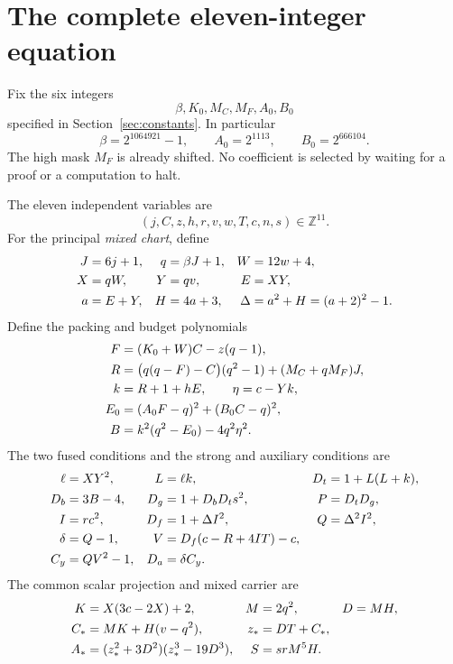 \documentclass[11pt]{article}
\newcommand{\Z}{\mathbb Z}
\theoremstyle{definition}
\theoremstyle{remark}
\begin{document}
\section{The complete eleven-integer equation}
\label{sec:equation}

Fix the six integers
\[
 \beta,K_0,M_C,M_F,A_0,B_0
\]
specified in Section~\ref{sec:constants}. In particular
\[
 \beta=2^{1064921}-1,\qquad A_0=2^{1113},\qquad B_0=2^{666104}.
\]
The high mask $M_F$ is already shifted. No coefficient is selected by
waiting for a proof or a computation to halt.

The eleven independent variables are
\begin{equation}\label{eq:variables}
 (j,C,z,h,r,v,w,T,c,n,s)\in\Z^{11}.
\end{equation}
For the principal \emph{mixed chart}, define
\begin{align}
 J&=6j+1,&q&=\beta J+1,&W&=12w+4,\notag\\
 X&=qW,&Y&=qv,&E&=XY,\notag\\
 a&=E+Y,&H&=4a+3,&\Delta&=a^2+H=(a+2)^2-1.\label{eq:front}
\end{align}
Define the packing and budget polynomials
\begin{align}
 F&=(K_0+W)C-z(q-1),\notag\\
 R&=\bigl(q(q-F)-C\bigr)(q^2-1)+(M_C+qM_F)J,\notag\\
 k&=R+1+hE,\qquad \eta=c-Yk,\notag\\
 E_0&=(A_0F-q)^2+(B_0C-q)^2,\notag\\
 B&=k^2(q^2-E_0)-4q^2\eta^2.\label{eq:budget}
\end{align}
The two fused conditions and the strong and auxiliary conditions are
\begin{align}
 \ell&=XY^2,&L&=\ell k,&D_t&=1+L(L+k),\notag\\
 D_b&=3B-4,&D_g&=1+D_bD_ts^2,&P&=D_tD_g,\notag\\
 I&=rc^2,&D_f&=1+\Delta I^2,&Q&=\Delta^2I^2,\notag\\
 \delta&=Q-1,&V&=D_f(c-R+4IT)-c,\notag\\
 C_y&=QV^2-1,&D_a&=\delta C_y.\label{eq:pell}
\end{align}
The common scalar projection and mixed carrier are
\begin{align}
 K&=X(3c-2X)+2,& M&=2q^2,&D&=MH,\notag\\
 C_*&=MK+H(v-q^2),&z_*&=DT+C_*,\notag\\
 A_*&=(z_*^2+3D^2)(z_*^3-19D^3),&S&=srM^5H.\label{eq:carrier}
\end{align}
\end{document}
